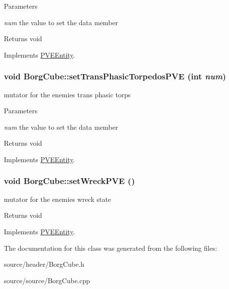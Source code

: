 \begin{DoxyParams}{Parameters}
\item[{\em num}]the value to set the data member\end{DoxyParams}
\begin{DoxyReturn}{Returns}
void 
\end{DoxyReturn}


Implements \hyperlink{classPVEEntity}{PVEEntity}.

\hypertarget{classBorgCube_a57d56e4d39de504354dd318a23f7dab7}{
\subsubsection[{setTransPhasicTorpedosPVE}]{\setlength{\rightskip}{0pt plus 5cm}void BorgCube::setTransPhasicTorpedosPVE (int {\em num})}}
\label{d2/d93/classBorgCube_a57d56e4d39de504354dd318a23f7dab7}
mutator for the enemies trans phasic torps


\begin{DoxyParams}{Parameters}
\item[{\em num}]the value to set the data member\end{DoxyParams}
\begin{DoxyReturn}{Returns}
void 
\end{DoxyReturn}


Implements \hyperlink{classPVEEntity}{PVEEntity}.

\hypertarget{classBorgCube_ad764e3b9b70804c7cb2f292628fcf7fd}{
\subsubsection[{setWreckPVE}]{\setlength{\rightskip}{0pt plus 5cm}void BorgCube::setWreckPVE ()}}
\label{d2/d93/classBorgCube_ad764e3b9b70804c7cb2f292628fcf7fd}
mutator for the enemies wreck state

\begin{DoxyReturn}{Returns}
void 
\end{DoxyReturn}


Implements \hyperlink{classPVEEntity}{PVEEntity}.



The documentation for this class was generated from the following files:\begin{DoxyCompactItemize}
\item 
source/header/BorgCube.h\item 
source/source/BorgCube.cpp\end{DoxyCompactItemize}
